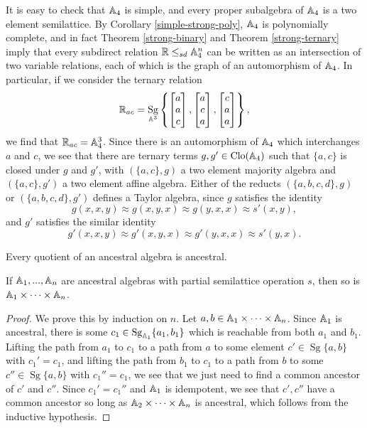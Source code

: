 \documentclass[letterpaper,11pt]{article}
\DeclareMathOperator{\Clo}{Clo}
\DeclareMathOperator{\Sg}{Sg}
\begin{document}
\begin{ex}
It is easy to check that $\mathbb{A}_4$ is simple, and every proper subalgebra of $\mathbb{A}_4$ is a two element semilattice. By Corollary \ref{simple-strong-poly}, $\mathbb{A}_4$ is polynomially complete, and in fact Theorem \ref{strong-binary} and Theorem \ref{strong-ternary} imply that every subdirect relation $\mathbb{R} \le_{sd} \mathbb{A}_4^n$ can be written as an intersection of two variable relations, each of which is the graph of an automorphism of $\mathbb{A}_4$. In particular, if we consider the ternary relation
\[
\RR_{ac} = \Sg_{\bA^3}\left\{\begin{bmatrix}a\\ a\\ c\end{bmatrix}, \begin{bmatrix}a\\ c\\ a\end{bmatrix}, \begin{bmatrix}c\\ a\\ a\end{bmatrix}\right\},
\]
we find that $\mathbb{R}_{ac} = \mathbb{A}_4^3$. Since there is an automorphism of $\mathbb{A}_4$ which interchanges $a$ and $c$, we see that there are ternary terms $g, g' \in \Clo(\bA_4)$ such that $\{a,c\}$ is closed under $g$ and $g'$, with $(\{a,c\},g)$ a two element majority algebra and $(\{a,c\}, g')$ a two element affine algebra. Either of the reducts $(\{a,b,c,d\},g)$ or $(\{a,b,c,d\},g')$ defines a Taylor algebra, since $g$ satisfies the identity
\[
g(x,x,y) \approx g(x,y,x) \approx g(y,x,x) \approx s'(x,y),
\]
and $g'$ satisfies the similar identity
\[
g'(x,x,y) \approx g'(x,y,x) \approx g'(y,x,x) \approx s'(y,x).
\]
\end{ex}

\begin{prop} Every quotient of an ancestral algebra is ancestral.
\end{prop}

\begin{thm} If $\mathbb{A}_1, ..., \mathbb{A}_n$ are ancestral algebras with partial semilattice operation $s$, then so is $\mathbb{A}_1 \times \cdots \times \mathbb{A}_n$.
\end{thm}
\begin{proof} We prove this by induction on $n$. Let $a,b \in \mathbb{A}_1 \times \cdots \times \mathbb{A}_n$. Since $\mathbb{A}_1$ is ancestral, there is some $c_1 \in \Sg_{\bA_1}\{a_1,b_1\}$ which is reachable from both $a_1$ and $b_1$. Lifting the path from $a_1$ to $c_1$ to a path from $a$ to some element $c' \in \Sg\{a,b\}$ with $c_1' = c_1$, and lifting the path from $b_1$ to $c_1$ to a path from $b$ to some $c'' \in \Sg\{a,b\}$ with $c_1'' = c_1$, we see that we just need to find a common ancestor of $c'$ and $c''$. Since $c_1' = c_1''$ and $\mathbb{A}_1$ is idempotent, we see that $c',c''$ have a common ancestor so long as $\mathbb{A}_2 \times \cdots \times \mathbb{A}_n$ is ancestral, which follows from the inductive hypothesis.
\end{proof}
\end{document}

